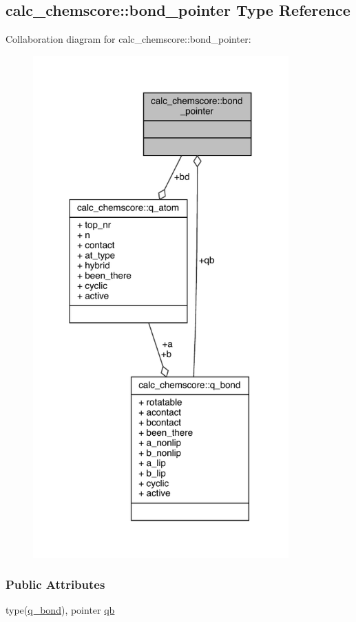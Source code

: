\hypertarget{structcalc__chemscore_1_1bond__pointer}{\subsection{calc\-\_\-chemscore\-:\-:bond\-\_\-pointer Type Reference}
\label{structcalc__chemscore_1_1bond__pointer}
}


Collaboration diagram for calc\-\_\-chemscore\-:\-:bond\-\_\-pointer\-:
\nopagebreak
\begin{figure}[H]
\begin{center}
\leavevmode
\includegraphics[width=278pt]{structcalc__chemscore_1_1bond__pointer__coll__graph}
\end{center}
\end{figure}
\subsubsection*{Public Attributes}
\begin{DoxyCompactItemize}
\item 
type(\hyperlink{structcalc__chemscore_1_1q__bond}{q\-\_\-bond}), pointer \hyperlink{structcalc__chemscore_1_1bond__pointer_a81412f914796a27ac52ec9bb35631cef}{qb}
\end{DoxyCompactItemize}


